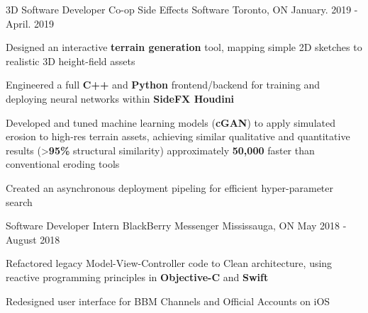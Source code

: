 \begin{cventries}
  \cventry
    {3D Software Developer Co-op} %
    {Side Effects Software} %
    {Toronto, ON} %
    {January. 2019 - April. 2019} %
    {
      \begin{cvitems} %
        \item {Designed an interactive \textbf{terrain generation} tool, mapping simple 2D sketches to realistic 3D height-field assets}
        \item {Engineered a full \textbf{C++} and \textbf{Python} frontend/backend for training and deploying neural networks within \textbf{SideFX Houdini}}
        \item {Developed and tuned machine learning models (\textbf{cGAN}) to apply simulated erosion to high-res terrain assets, achieving similar qualitative and quantitative results (>\textbf{95\%} structural similarity) approximately \textbf{50,000\times} faster than conventional eroding tools}
        \item {Created an asynchronous deployment pipeling for efficient hyper-parameter search}
      \end{cvitems}
    }

  \cventry
    {Software Developer Intern} %
    {BlackBerry Messenger} %
    {Mississauga, ON} %
    {May 2018 - August 2018} %
    {
      \begin{cvitems} %
        \item {Refactored legacy Model-View-Controller code to Clean architecture, using reactive programming principles in \textbf{Objective-C} and \textbf{Swift}}
        \item {Redesigned user interface for BBM Channels and Official Accounts on iOS}
      \end{cvitems}
    }

\end{cventries}
